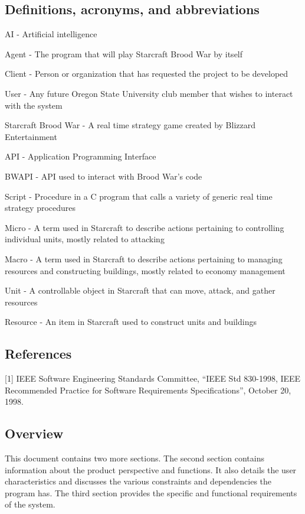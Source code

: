 \subsection{Definitions, acronyms, and abbreviations}
AI - Artificial intelligence

Agent - The program that will play Starcraft Brood War by itself

Client - Person or organization that has requested the project to be developed

User - Any future Oregon State University club member that wishes to interact with the system

Starcraft Brood War - A real time strategy game created by Blizzard Entertainment

API - Application Programming Interface

BWAPI - API used to interact with Brood War's code

Script - Procedure in a C program that calls a variety of generic real time strategy procedures

Micro - A term used in Starcraft to describe actions pertaining to controlling individual units, mostly related to attacking

Macro - A term used in Starcraft to describe actions pertaining to managing resources and constructing buildings, mostly related to economy management

Unit - A controllable object in Starcraft that can move, attack, and gather resources

Resource - An item in Starcraft used to construct units and buildings

\subsection{References}
[1] IEEE Software Engineering Standards Committee, “IEEE Std 830-1998, IEEE Recommended Practice for Software Requirements Specifications”, October 20, 1998.

\subsection{Overview}
This document contains two more sections. The second section contains information about the product perspective and functions. It also details the user characteristics and discusses the various constraints and dependencies the program has. The third section provides the specific and functional requirements of the system.

